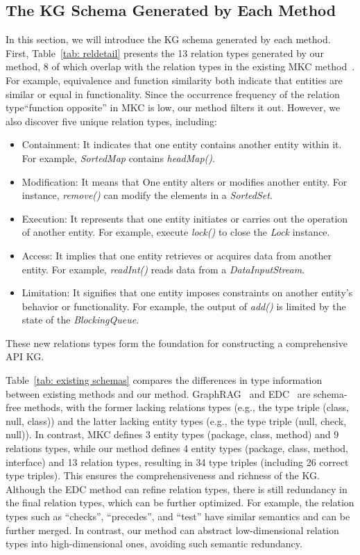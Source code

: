 \subsection{The KG Schema Generated by Each Method}\label{section: newrel}
In this section, we will introduce the KG schema generated by each method.
First, Table~\ref{tab: reldetail} presents the 13 relation types generated by our method, 8 of which overlap with the relation types in the existing MKC method~\cite{Manual}.
For example, equivalence and function similarity both indicate that entities are similar or equal in functionality.
Since the occurrence frequency of the relation type``function opposite'' in MKC is low, our method filters it out.
However, we also discover five unique relation types, including: 
\begin{itemize}
\item Containment: It indicates that one entity contains another entity within it.
For example, \textit{SortedMap} contains \textit{headMap()}.
\item Modification: It means that One entity alters or modifies another entity.
For instance, \textit{remove()} can modify the elements in a \textit{SortedSet}.
\item Execution: It represents that one entity initiates or carries out the operation of another entity.
For example, execute \textit{lock()} to close the \textit{Lock} instance.
\item Access: It implies that one entity retrieves or acquires data from another entity.
For example, \textit{readInt()} reads data from a \textit{DataInputStream}.
\item Limitation: It signifies that one entity imposes constraints on another entity’s behavior or
functionality.
For example, the output of \textit{add()} is limited by the state of the \textit{BlockingQueue}.
\end{itemize}
These new relations types form the foundation for constructing a comprehensive API KG.

Table~\ref{tab: existing schemas} compares the differences in type information between existing methods and our method.
GraphRAG~\cite{GraphRAG} and EDC~\cite{EDC} are schema-free methods, with the former lacking relations types (e.g., the type triple (class, null, class)) and the latter lacking entity types (e.g., the type triple (null, check, null)).
In contrast, MKC defines 3 entity types (package, class, method) and 9 relations types, while our method defines 4 entity types (package, class, method, interface) and 13 relation types, resulting in 34 type triples (including 26 correct type triples).
This ensures the comprehensiveness and richness of the KG.
Although the EDC method can refine relation types, there is still redundancy in the final relation types, which can be further optimized.
For example, the relation types such as ``checks'', ``precedes'', and ``test'' have similar semantics and can be further merged.
In contrast, our method can abstract low-dimensional relation types into high-dimensional ones, avoiding such semantic redundancy.

